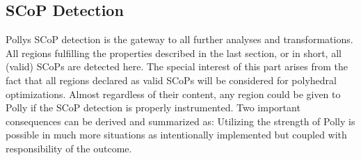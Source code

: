 


\subsection{SCoP Detection}
Pollys SCoP detection is the gateway to all further analyses and 
transformations. All regions fulfilling the properties described in the 
last section, or in short, all (valid) SCoPs are detected here. 
The special interest of this part arises from the fact that all 
regions declared as valid SCoPs will be considered for polyhedral 
optimizations. Almost regardless of their content, any region could be given to
Polly if the SCoP detection is properly instrumented. Two important consequences
can be derived and summarized as:
Utilizing the strength of Polly is possible in much more situations as 
intentionally implemented but coupled with responsibility of the outcome.

